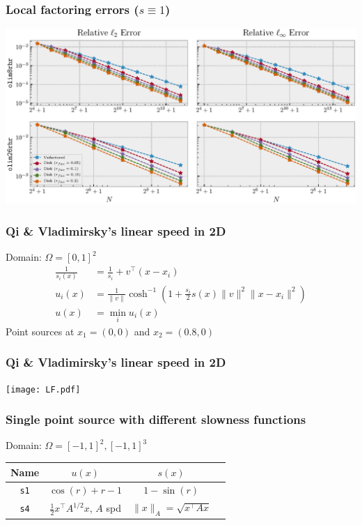 \documentclass{beamer}
\begin{document}
\begin{frame}
  \frametitle{Local factoring errors ($s \equiv 1$)}
  \centering
  \includegraphics[width=\linewidth]{factoring-error-example.eps}
\end{frame}

\begin{frame}
  \frametitle{Qi \& Vladimirsky's linear speed in 2D}
  Domain: $\Omega = [0, 1]^2$
  \begin{align*}
    \frac{1}{s_i(x)} &= \frac{1}{s_i} + v^\top {(x - x_i)} \\
    u_i(x) &= \frac{1}{\|v\|} \cosh^{-1} \left(1 + \frac{s_i}{2} s(x) \|v\|^2 \|x - x_i\|^2\right) \\
    u(x) &= \min_i u_i(x)
  \end{align*}
  Point sources at $x_1 = (0, 0)$ and $x_2 = (0.8, 0)$
\end{frame}

\begin{frame}
  \frametitle{Qi \& Vladimirsky's linear speed in 2D}
  \centering
  \texttt{[image: LF.pdf]}
\end{frame}

\begin{frame}
  \frametitle{Single point source with different slowness functions}
  Domain: $\Omega = [-1, 1]^2, [-1, 1]^3$
  \vspace{1em}
  \begin{center}
  \begin{tabular}{cccc}
    Name & $u(x)$ & $s(x)$ \\
    \midrule
    \texttt{s1} & $\cos(r) + r - 1$ & $1 - \sin(r)$ \\
    \texttt{s4} & $\tfrac{1}{2} x^\top A^{1/2} x$, $A$ spd & $\|x\|_A = \sqrt{x^\top A x}$
  \end{tabular}
  \end{center}
\end{frame}
\end{document}
